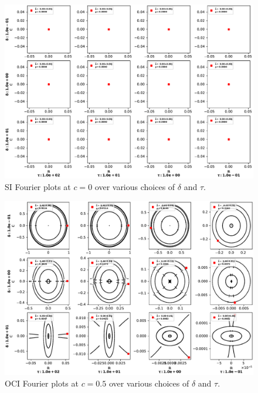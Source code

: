 \begin{figure}
\begin{center}
	\includegraphics[width=\textwidth]{appendix/eig_plots/si0.0.pdf}
	\caption{SI Fourier plots at $c=0$ over various choices of $\delta$ and $\tau$.}
\end{center}
\end{figure}

\begin{figure}
\begin{center}
	\includegraphics[width=\textwidth]{appendix/eig_plots/oci0.5.pdf}
	\caption{OCI Fourier plots at $c=0.5$ over various choices of $\delta$ and $\tau$.}
\end{center}
\end{figure}

